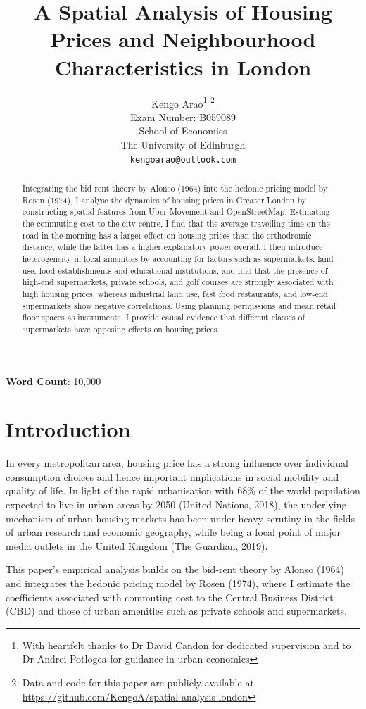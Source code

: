 \documentclass{article}
\title{A Spatial Analysis of Housing Prices and Neighbourhood Characteristics in London}
\author{
  \large{Kengo Arao}\thanks{With heartfelt thanks to Dr David Candon for dedicated supervision and to Dr Andrei Potlogea for guidance in urban economics}      \thanks{Data and code for this paper are publicly available at \href{https://github.com/KengoA/spatial-analysis-london}{https://github.com/KengoA/spatial-analysis-london}} \\
  Exam Number: B059089 \\
  School of Economics\\
  The University of Edinburgh\\
  \texttt{kengoarao@outlook.com}
}
\begin{document}
\maketitle

\begin{abstract}
Integrating the bid rent theory by Alonso (1964) into the hedonic pricing model by Rosen (1974), I analyse the dynamics of housing prices in Greater London by constructing spatial features from Uber Movement and OpenStreetMap. Estimating the commuting cost to the city centre, I find that the average travelling time on the road in the morning has a larger effect on housing prices than the orthodromic distance, while the latter has a higher explanatory power overall. I then introduce heterogeneity in local amenities by accounting for factors such as supermarkets, land use, food establishments and educational institutions, and find that the presence of high-end supermarkets, private schools, and golf courses are strongly associated with high housing prices, whereas industrial land use, fast food restaurants, and low-end supermarkets show negative correlations. Using planning permissions and mean retail floor spaces as instruments, I provide causal evidence that different classes of supermarkets have opposing effects on housing prices.
\end{abstract}

\begin{center}
    \textbf{Word Count}: 10,000
\end{center}

\newpage
\tableofcontents

\newpage
\section{Introduction}
 In every metropolitan area, housing price has a strong influence over individual consumption choices and hence important implications in social mobility and quality of life. In light of the rapid urbanisation with 68\% of the world population expected to live in urban areas by 2050 (United Nations, 2018), the underlying mechanism of urban housing markets has been under heavy scrutiny in the fields of urban research and economic geography, while being a focal point of major media outlets in the United Kingdom (The Guardian, 2019).
 
 This paper's empirical analysis builds on the bid-rent theory by Alonso (1964) and integrates the hedonic pricing model by Rosen (1974), where I estimate the coefficients associated with commuting cost to the Central Business District (CBD) and those of urban amenities such as private schools and supermarkets. 
 
\end{document}
